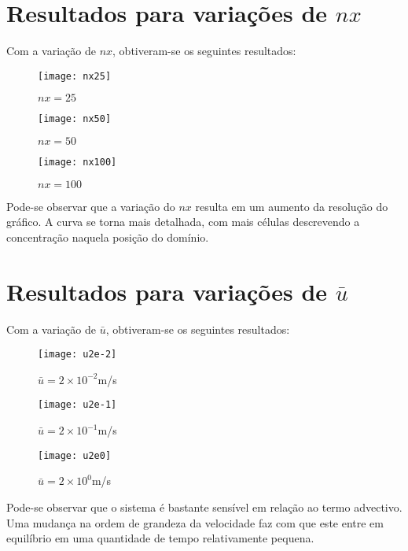 \section{Resultados para variações de $nx$}
Com a variação de $nx$, obtiveram-se os seguintes resultados:
\begin{figure}[H]
    \centering
    \texttt{[image: nx25]}
    \caption{$nx = 25$}
\end{figure}
\begin{figure}[H]
    \centering
    \texttt{[image: nx50]}
    \caption{$nx = 50$}
\end{figure}
\begin{figure}[H]
    \centering
    \texttt{[image: nx100]}
    \caption{$nx = 100$}
\end{figure}

Pode-se observar que a variação do $nx$ resulta em um aumento da resolução do
gráfico. A curva se torna mais detalhada, com mais células descrevendo a
concentração naquela posição do domínio.

\section{Resultados para variações de $\bar{u}$}
Com a variação de $\bar{u}$, obtiveram-se os seguintes resultados:
\begin{figure}[H]
    \centering
    \texttt{[image: u2e-2]}
    \caption{$\bar{u} = 2\times10^{-2}$m/s}
\end{figure}
\begin{figure}[H]
    \centering
    \texttt{[image: u2e-1]}
    \caption{$\bar{u} = 2\times10^{-1}$m/s}
\end{figure}
\begin{figure}[H]
    \centering
    \texttt{[image: u2e0]}
    \caption{$\bar{u} = 2\times10^{0}$m/s}
\end{figure}

Pode-se observar que o sistema é bastante sensível em relação ao termo
advectivo. Uma mudança na ordem de grandeza da velocidade faz com que este
entre em equilíbrio em uma quantidade de tempo relativamente pequena.

